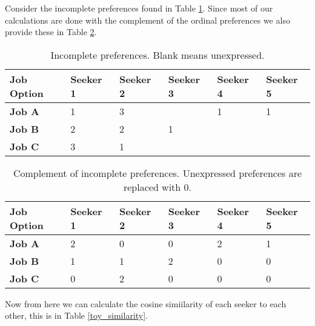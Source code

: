 Consider the incomplete preferences found in Table \ref{toy_incomplete}. Since most of our calculations are done with the complement of the ordinal preferences we also provide these in Table \ref{toy_complement}.

\begin{table}[h!]
\begin{center}
\caption{Incomplete preferences. Blank means unexpressed.}
\label{toy_incomplete}
\begin{tabular}{l|l|l|l|l|l}
\hline 
\textbf{Job Option} & \textbf{Seeker 1} &  \textbf{Seeker 2} & \textbf{Seeker 3} &\textbf{Seeker 4} &\textbf{Seeker 5} \\
\hline
\textbf{Job A} & 1 & 3 &  & 1 & 1\\
\textbf{Job B} & 2 & 2 & 1 & &\\
\textbf{Job C} & 3 & 1 &  & &\\
\hline 
\end{tabular}
\end{center}
\end{table}

\begin{table}[h!]
\begin{center}
\caption{Complement of incomplete preferences. Unexpressed preferences are replaced with 0.}
\label{toy_complement}
\begin{tabular}{l|l|l|l|l|l}
\hline 
\textbf{Job Option} & \textbf{Seeker 1} &  \textbf{Seeker 2} & \textbf{Seeker 3} &\textbf{Seeker 4} &\textbf{Seeker 5} \\
\hline
\textbf{Job A} & 2 & 0 & 0 & 2 & 1\\
\textbf{Job B} & 1 & 1 & 2 & 0 & 0\\
\textbf{Job C} & 0 & 2 & 0 & 0 & 0\\
\hline 
\end{tabular}
\end{center}
\end{table}

Now from here we can calculate the cosine simiilarity of each seeker to each other, this is in Table \ref{toy_similarity}.

